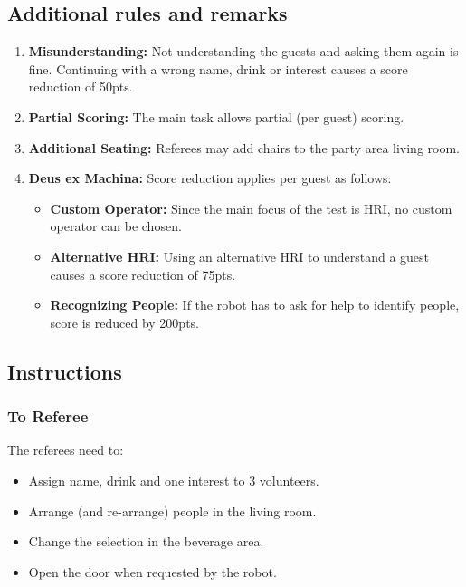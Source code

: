 \subsection*{Additional rules and remarks}
\begin{enumerate}[nosep]
	\item \textbf{Misunderstanding:} Not understanding the guests and asking them again is fine. Continuing with a wrong name, drink  or interest causes a score reduction of 50pts.
		
	\item \textbf{Partial Scoring:} The main task allows partial (per guest) scoring.

	\item \textbf{Additional Seating:} Referees may add chairs to the party area living room.
	
	\item \textbf{Deus ex Machina:} Score reduction applies per guest as follows:
	\begin{itemize}[nosep]
		\item \textbf{Custom Operator:} Since the main focus of the test is HRI, no custom operator can be chosen.
		\item \textbf{Alternative HRI:} Using an alternative HRI to understand a guest causes a score reduction of 75pts.
		\item \textbf{Recognizing People:} If the robot has to ask for help to identify people, score is reduced by 200pts. 
	\end{itemize}
\end{enumerate}


\subsection*{Instructions}

\subsubsection*{To Referee}

The referees need to:
\begin{itemize}
	\item Assign name, drink and one interest to 3 volunteers.
	\item Arrange (and re-arrange) people in the living room.
	\item Change the selection in the beverage area.
	\item Open the door when requested by the robot.
\end{itemize}

